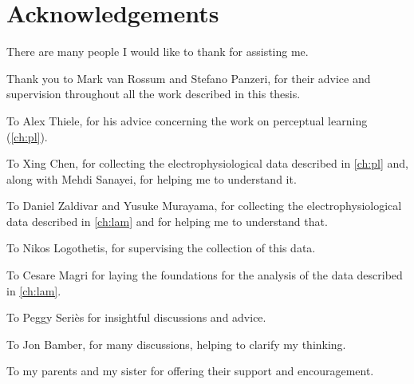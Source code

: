 

\begingroup

\let\clearpage\relax
\let\cleardoublepage\relax
\let\cleardoublepage\relax

\chapter*{Acknowledgements} %

There are many people I would like to thank for assisting me.

Thank you to Mark van Rossum and Stefano Panzeri, for their advice and supervision throughout all the work described in this thesis.

To Alex Thiele, for his advice concerning the work on perceptual learning (\autoref{ch:pl}).

To Xing Chen, for collecting the electrophysiological data described in \autoref{ch:pl} and, along with Mehdi Sanayei, for helping me to understand it.

To Daniel Zaldivar and Yusuke Murayama, for collecting the electrophysiological data described in \autoref{ch:lam} and for helping me to understand that.

To Nikos Logothetis, for supervising the collection of this data.

To Cesare Magri for laying the foundations for the analysis of the data described in \autoref{ch:lam}.

To Peggy Seri{\`e}s for insightful discussions and advice.

To Jon Bamber, for many discussions, helping to clarify my thinking.

To my parents and my sister for offering their support and encouragement.

\endgroup
